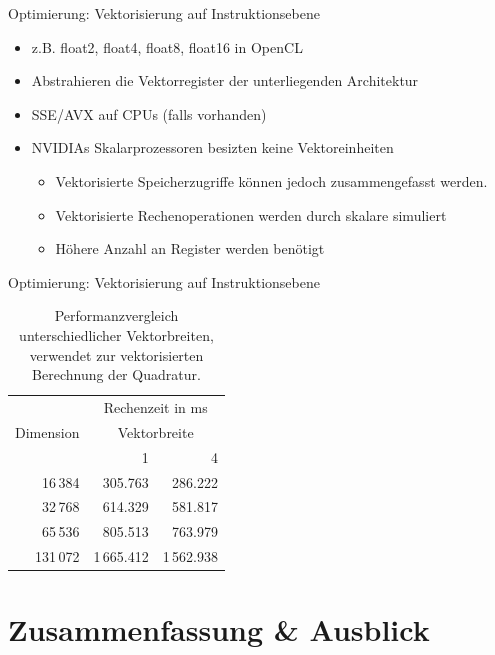 \documentclass[10pt]{beamer}
\begin{document}
\begin{frame}{Optimierung: Vektorisierung auf Instruktionsebene}
  \begin{itemize}
    \item z.B. float2, float4, float8, float16 in OpenCL
    \item Abstrahieren die Vektorregister der unterliegenden Architektur
    \item SSE/AVX auf CPUs (falls vorhanden)
    \item NVIDIAs Skalarprozessoren besizten keine Vektoreinheiten
    \begin{itemize}
      \item Vektorisierte Speicherzugriffe können jedoch zusammengefasst
            werden.
      \item Vektorisierte Rechenoperationen werden durch skalare simuliert
      \item Höhere Anzahl an Register werden benötigt
    \end{itemize}
  \end{itemize}
\end{frame}

\begin{frame}{Optimierung: Vektorisierung auf Instruktionsebene}
  \begin{table}[ht]\label{tab:vec}
    \begin{tabular}{rrr} \toprule
      \multirow{3}{*}{Dimension} & \multicolumn{2}{c}{Rechenzeit in ms} \\ 
      \cmidrule{2-3}
      & \multicolumn{2}{c}{Vektorbreite} \\ \cmidrule{2-3}
      & 1 & 4 \\ \midrule
       16\,384 &    305.763 &    286.222 \\
       32\,768 &    614.329 &    581.817 \\
       65\,536 &    805.513 &    763.979 \\
      131\,072 & 1\,665.412 & 1\,562.938 \\
      \bottomrule
    \end{tabular}
    \caption{Performanzvergleich unterschiedlicher Vektorbreiten, verwendet zur
             vektorisierten Berechnung der Quadratur.}
  \end{table}
\end{frame}

\section{Zusammenfassung \& Ausblick}
\end{document}
